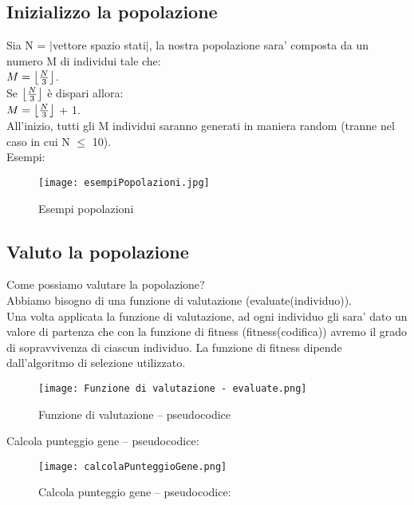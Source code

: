 \documentclass[10pt,a4paper]{article}
\begin{document}
    \subsection{Inizializzo la popolazione}
      \label{inizializzoLaPopolazioneSubsection}
      Sia N = $\lvert$vettore spazio stati$\rvert$, la nostra popolazione sara' composta da un numero M di individui tale che:\\ 
      $ M = \bigl\lfloor {N \over 3} \bigl\rfloor $.\\
      Se $\bigl\lfloor {N \over 3} \bigl\rfloor $ è dispari allora:\\ 
      $ M = \bigl\lfloor {N \over 3} \bigl\rfloor $ + 1.\\
      All'inizio, tutti gli M individui saranno generati in maniera random (tranne nel caso in cui N $\leq$ 10).\\
      Esempi:
      \begin{figure}
        \centering
        \caption{Esempi popolazioni}
        \texttt{[image: esempiPopolazioni.jpg]}
        \label{esempiPopolazioni}
      \end{figure}
      
      \newpage
      
    \subsection{Valuto la popolazione}
      \label{valutoLaPopolazioneSubsection}
      
      Come possiamo valutare la popolazione?\\
      Abbiamo bisogno di una funzione di valutazione (evaluate(individuo)).\\
      Una volta applicata la funzione di valutazione, ad ogni individuo gli sara' dato un valore di 
      partenza che con la funzione di fitness (fitness(codifica)) avremo il grado di sopravvivenza di ciascun 
      individuo. La funzione di fitness dipende dall'algoritmo di selezione utilizzato.\\
      
      \newpage
      \begin{figure}[h!]
        \centering
        \caption{Funzione di valutazione -- pseudocodice}
        \texttt{[image: Funzione di valutazione - evaluate.png]}
        \label{funzioneDiValutazionePseudocodice}
      \end{figure}
   
    \newpage
      Calcola punteggio gene -- pseudocodice:
       \begin{figure}[h!]
        \centering
        \caption{Calcola punteggio gene -- pseudocodice:}
        \texttt{[image: calcolaPunteggioGene.png]}
        \label{calcolaPunteggioGenePseudocodice}
      \end{figure}
      
\end{document}
